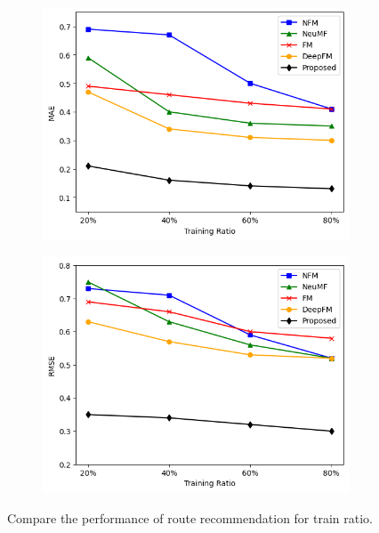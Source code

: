 \documentclass[]{article}
\begin{document}
\begin{figure}[!htbp]
	\centering
	\begin{subfigure}[b]{0.495\textwidth}
		\centering
		\includegraphics[width=\textwidth]{fig/Training_MAE.png}
		\label{fig:image1}
	\end{subfigure}
	\hfill
	\begin{subfigure}[b]{0.495\textwidth}
		\centering
		\includegraphics[width=\textwidth]{fig/Training_RMSE.png}
		\label{fig:image2}
	\end{subfigure}
	\caption{Compare the performance of route recommendation for train ratio.}
	\label{sec6:results2}
\end{figure}
\end{document}
